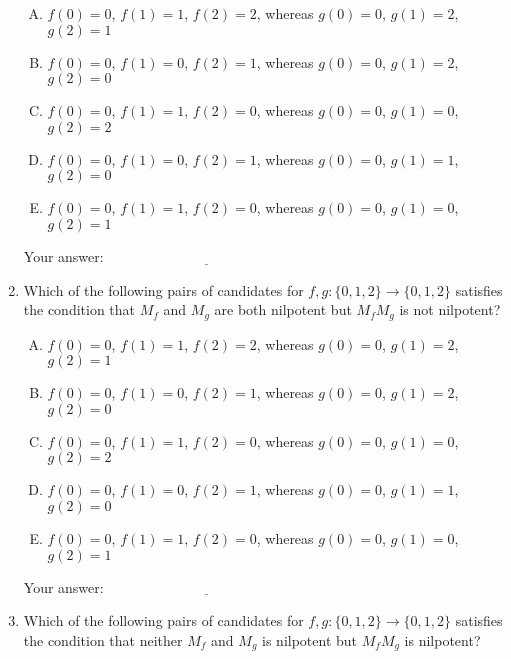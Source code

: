 \documentclass[10pt]{amsart}
\begin{document}
\begin{enumerate}
  \begin{enumerate}[(A)]
  \item $f(0) = 0$, $f(1) = 1$, $f(2) = 2$, whereas $g(0) = 0$, $g(1)
    = 2$, $g(2) = 1$
  \item $f(0) = 0$, $f(1) = 0$, $f(2) = 1$, whereas $g(0) = 0$, $g(1)
    = 2$, $g(2) = 0$
  \item $f(0) = 0$, $f(1) = 1$, $f(2) = 0$, whereas $g(0) = 0$, $g(1)
    = 0$, $g(2) = 2$
  \item $f(0) = 0$, $f(1) = 0$, $f(2) = 1$, whereas $g(0) = 0$, $g(1)
    = 1$, $g(2) = 0$
  \item $f(0) = 0$, $f(1) = 1$, $f(2) = 0$, whereas $g(0) = 0$, $g(1)
    = 0$, $g(2) = 1$
  \end{enumerate}

  \vspace{0.1in}
  Your answer: $\underline{\qquad\qquad\qquad\qquad\qquad\qquad\qquad}$
  \vspace{0.1in}

\item Which of the following pairs of candidates for $f,g: \{ 0,1,2 \}
  \to \{ 0,1,2 \}$ satisfies the condition that $M_f$ and $M_g$ are
  both nilpotent but $M_fM_g$ is not nilpotent?

  \begin{enumerate}[(A)]
  \item $f(0) = 0$, $f(1) = 1$, $f(2) = 2$, whereas $g(0) = 0$, $g(1)
    = 2$, $g(2) = 1$
  \item $f(0) = 0$, $f(1) = 0$, $f(2) = 1$, whereas $g(0) = 0$, $g(1)
    = 2$, $g(2) = 0$
  \item $f(0) = 0$, $f(1) = 1$, $f(2) = 0$, whereas $g(0) = 0$, $g(1)
    = 0$, $g(2) = 2$
  \item $f(0) = 0$, $f(1) = 0$, $f(2) = 1$, whereas $g(0) = 0$, $g(1)
    = 1$, $g(2) = 0$
  \item $f(0) = 0$, $f(1) = 1$, $f(2) = 0$, whereas $g(0) = 0$, $g(1)
    = 0$, $g(2) = 1$
  \end{enumerate}

  \vspace{0.1in}
  Your answer: $\underline{\qquad\qquad\qquad\qquad\qquad\qquad\qquad}$
  \vspace{0.1in}

\item Which of the following pairs of candidates for $f,g: \{ 0,1,2 \}
  \to \{ 0,1,2 \}$ satisfies the condition that neither $M_f$ and
  $M_g$ is nilpotent but $M_fM_g$ is nilpotent?


\end{enumerate}
\end{document}
